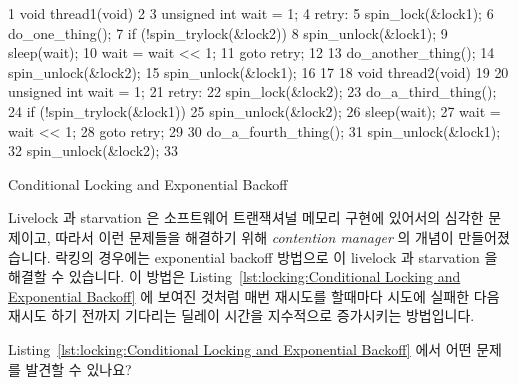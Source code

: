 \begin{listing}[tbp]
{ \scriptsize
\begin{verbbox}
  1 void thread1(void)
  2 {
  3   unsigned int wait = 1;
  4 retry:
  5   spin_lock(&lock1);
  6   do_one_thing();
  7   if (!spin_trylock(&lock2)) {
  8     spin_unlock(&lock1);
  9     sleep(wait);
 10     wait = wait << 1;
 11     goto retry;
 12   }
 13   do_another_thing();
 14   spin_unlock(&lock2);
 15   spin_unlock(&lock1);
 16 }
 17 
 18 void thread2(void)
 19 {
 20   unsigned int wait = 1;
 21 retry:
 22   spin_lock(&lock2);
 23   do_a_third_thing();
 24   if (!spin_trylock(&lock1)) {
 25     spin_unlock(&lock2);
 26     sleep(wait);
 27     wait = wait << 1;
 28     goto retry;
 29   }
 30   do_a_fourth_thing();
 31   spin_unlock(&lock1);
 32   spin_unlock(&lock2);
 33 }
\end{verbbox}
}
\centering
\theverbbox
\caption{Conditional Locking and Exponential Backoff}
\label{lst:locking:Conditional Locking and Exponential Backoff}
\end{listing}

Livelock 과 starvation 은 소프트웨어 트랜잭셔널 메모리 구현에 있어서의 심각한
문제이고, 따라서 이런 문제들을 해결하기 위해 \emph{contention manager} 의
개념이 만들어졌습니다.
락킹의 경우에는 exponential backoff 방법으로 이 livelock 과 starvation 을
해결할 수 있습니다.
이 방법은 Listing~\ref{lst:locking:Conditional Locking and Exponential Backoff}
에 보여진 것처럼 매번 재시도를 할때마다 시도에 실패한 다음 재시도 하기 전까지
기다리는 딜레이 시간을 지수적으로 증가시키는 방법입니다.

\QuickQuiz{}
	Listing~\ref{lst:locking:Conditional Locking and Exponential Backoff}
	에서 어떤 문제를 발견할 수 있나요?
	\iffalse

